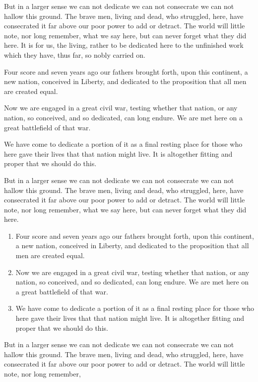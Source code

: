 \documentclass{roffin}
\begin{document}
But in a larger sense we can not dedicate we can not consecrate we can not hallow this ground. The brave men, living and dead,
who struggled, here, have consecrated it far above our poor power to add or detract. The world will little note, nor long remember,
what we say here, but can never forget what they did here. It is for us, the living, rather to be dedicated here to the unfinished work
which they have, thus far, so nobly carried on.
\begin{unnumlist}
\item{}%
Four score and seven years ago our fathers brought forth,
upon this continent, a new nation, conceived in Liberty, and dedicated to
the proposition that all men are created equal.
\item{}%
Now we are engaged in a great civil war, testing whether that nation, or any nation, so conceived, and so dedicated, can long endure.
We are met here on a great battlefield of that war.
\item{}%
We have come to dedicate a portion of it as a final resting place for those who
here gave their lives that that nation might live. It is altogether fitting and proper that we should do this.
\end{unnumlist}
But in a larger sense we can not dedicate we can not consecrate we can not hallow this ground. The brave men, living and dead,
who struggled, here, have consecrated it far above our poor power to add or detract. The world will little note, nor long remember,
what we say here, but can never forget what they did here.
\begin{enumerate}
\item{}%
Four score and seven years ago our fathers brought forth,
upon this continent, a new nation, conceived in Liberty, and dedicated to
the proposition that all men are created equal.
\item{}%
Now we are engaged in a great civil war, testing whether that nation, or any nation, so conceived, and so dedicated, can long endure.
We are met here on a great battlefield of that war.
\item{}%
We have come to dedicate a portion of it as a final resting place for those who
here gave their lives that that nation might live. It is altogether fitting and proper that we should do this.
\end{enumerate}
But in a larger sense we can not dedicate we can not consecrate we can not hallow this ground. The brave men, living and dead,
who struggled, here, have consecrated it far above our poor power to add or detract. The world will little note, nor long remember,
\end{document}
